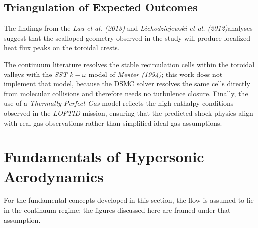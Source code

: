 \subsection{Triangulation of Expected Outcomes}
The findings from the \textit{Lau et al. (2013)} and \textit{Lichodziejewski et al. (2012)}analyses suggest that the scalloped geometry observed in the study will produce localized heat flux peaks on the toroidal crests.

The continuum literature resolves the stable recirculation cells within the toroidal valleys with the \textit{SST $k-\omega$} model of \textit{Menter (1994)}; this work does not implement that model, because the DSMC solver resolves the same cells directly from molecular collisions and therefore needs no turbulence closure. Finally, the use of a \textit{Thermally Perfect Gas} model reflects the high-enthalpy conditions observed in the \textit{LOFTID} mission, ensuring that the predicted shock physics align with real-gas observations rather than simplified ideal-gas assumptions.

\section{Fundamentals of Hypersonic Aerodynamics}

For the fundamental concepts developed in this section, the flow is assumed to lie in the continuum regime; the figures discussed here are framed under that assumption.

